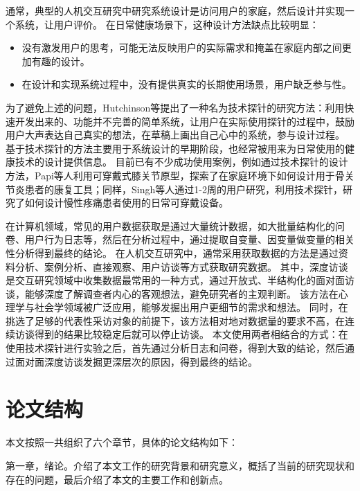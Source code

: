 通常，典型的人机交互研究中研究系统设计是访问用户的家庭，然后设计并实现一个系统，让用户评价。
在日常健康场景下，这种设计方法缺点比较明显\cite{Hutchinson2003Technology}：

\begin{itemize}
    \item 没有激发用户的思考，可能无法反映用户的实际需求和掩盖在家庭内部之间更加有趣的设计。
    \item 在设计和实现系统过程中，没有提供真实的长期使用场景，用户缺乏参与性。
\end{itemize}


为了避免上述的问题，Hutchinson等\cite{Hutchinson2003Technology}提出了一种名为技术探针的研究方法：利用快速开发出来的、功能并不完善的简单系统，让用户在实际使用探针的过程中，鼓励用户大声表达自己真实的想法，在草稿上画出自己心中的系统，参与设计过程。
基于技术探针的方法主要用于系统设计的早期阶段\cite{turmo2020training}，也经常被用来为日常使用的健康技术的设计提供信息。
目前已有不少成功使用案例，例如通过技术探针的设计方法，Papi等人\cite{papi2015knee}利用可穿戴式膝关节原型，探索了在家庭环境下如何设计用于骨关节炎患者的康复工具；同样，Singh等人\cite{singh2017supporting}通过1-2周的用户研究，利用技术探针，研究了如何设计慢性疼痛患者使用的日常可穿戴设备。

在计算机领域，常见的用户数据获取是通过大量统计数据，如大批量结构化的问卷、用户行为日志等，然后在分析过程中，通过提取自变量、因变量做变量的相关性分析得到最终的结论。
在人机交互研究中，通常采用获取数据的方法是通过资料分析、案例分析、直接观察、用户访谈等方式获取研究数据。
其中，深度访谈是交互研究领域中收集数据最常用的一种方式，通过开放式、半结构化的面对面访谈，能够深度了解调查者内心的客观想法，避免研究者的主观判断。
该方法在心理学与社会学领域被广泛应用，能够发掘出用户更细节的需求和想法。
同时，在挑选了足够的代表性采访对象的前提下，该方法相对地对数据量的要求不高，在连续访谈得到的结果比较稳定后就可以停止访谈\cite{cleary2014data}。
本文使用两者相结合的方式：在使用技术探针进行实验之后，首先通过分析日志和问卷，得到大致的结论，然后通过面对面深度访谈发掘更深层次的原因，得到最终的结论。



\section{论文结构}
本文按照一共组织了六个章节，具体的论文结构如下：

第一章，绪论。介绍了本文工作的研究背景和研究意义，概括了当前的研究现状和存在的问题，最后介绍了本文的主要工作和创新点。


